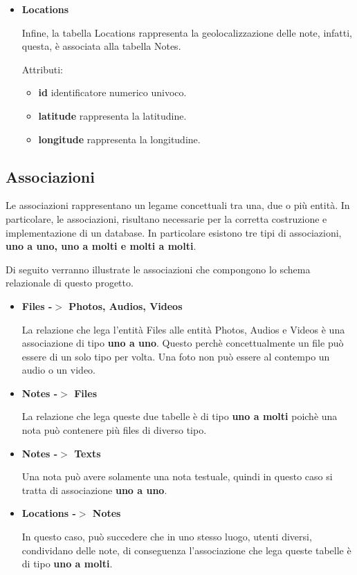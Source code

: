 \begin{itemize}
	\item \textbf{Locations}
	
		Infine, la tabella Locations rappresenta la geolocalizzazione delle note, infatti, questa, è associata alla tabella Notes.
		
		Attributi:
		\begin{itemize}
			\item \textbf{id} identificatore numerico univoco.
			\item \textbf{latitude} rappresenta la latitudine.
			\item \textbf{longitude} rappresenta la longitudine.
		\end{itemize}
	
\end{itemize}

\subsection{Associazioni}

Le associazioni rappresentano un legame concettuali tra una, due o più entità. In particolare, le associazioni, risultano necessarie per la corretta costruzione e implementazione di un database. In particolare esistono tre tipi di associazioni, \textbf{uno a uno, uno a molti e molti a molti}.

Di seguito verranno illustrate le associazioni che compongono lo schema relazionale di questo progetto.

\begin{itemize}
	\item \textbf{Files -$>$ Photos, Audios, Videos}
	
	La relazione che lega l'entità Files alle entità Photos, Audios e Videos è una associazione di tipo \textbf{uno a uno}. Questo perchè concettualmente un file può essere di un solo tipo per volta. Una foto non può essere al contempo un audio o un video.
	
	\item \textbf{Notes -$>$ Files}
	
	La relazione che lega queste due tabelle è di tipo \textbf{uno a molti} poichè una nota può contenere più files di diverso tipo.
	
	\item \textbf{Notes -$>$ Texts}
	
	Una nota può avere solamente una nota testuale, quindi in questo caso si tratta di associazione \textbf{uno a uno}.
	
	\item \textbf{Locations -$>$ Notes}
	
	In questo caso, può succedere che in uno stesso luogo, utenti diversi, condividano delle note, di conseguenza l'associazione che lega queste tabelle è di tipo \textbf{uno a molti}. 
\end{itemize}


